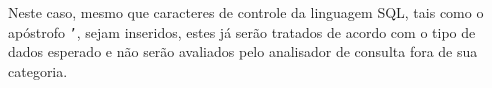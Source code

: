 \begin{frame}[fragile]{}

Neste caso, mesmo que caracteres de controle da linguagem SQL, tais
como o apóstrofo {\tt '}, sejam inseridos, estes já serão tratados de
acordo com o tipo de dados esperado e não serão avaliados pelo
analisador de consulta fora de sua categoria. 


\end{frame}

